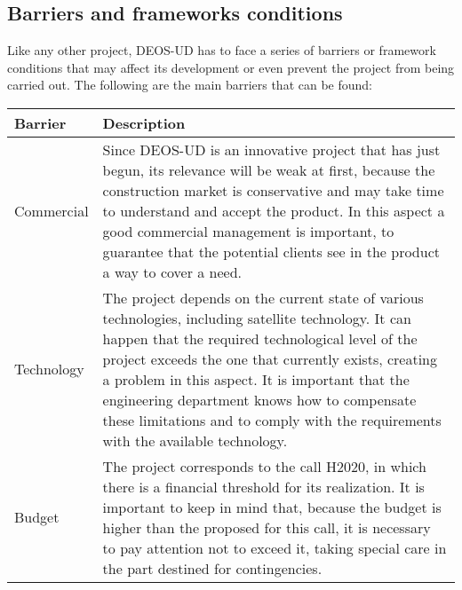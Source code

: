 \pagebreak

\subsection{Barriers and frameworks conditions}

Like any other project, DEOS-UD has to face a series of barriers or framework conditions that may affect its development or even prevent the project from being carried out. The following are the main barriers that can be found:

\begin{table}[H]
	\centering
	\begin{tabular}{l p{12cm}}
		
		\toprule[2pt]
		
		\textbf{Barrier} &  \textbf{Description}\\
		
		\midrule [1.5pt]
		
		Commercial & Since DEOS-UD is an innovative project that has just begun, its relevance will be weak at first, because the construction market is conservative and may take time to understand and accept the product. In this aspect a good commercial management is important, to guarantee that the potential clients see in the product a way to cover a need.
		\vspace{0.2cm}\\
		
		\midrule
		
		Technology & The project depends on the current state of various technologies, including satellite technology. It can happen that the required technological level of the project exceeds the one that currently exists, creating a problem in this aspect. It is important that the engineering department knows how to compensate these limitations and to comply with the requirements with the available technology.\vspace{0.2cm}\\
		
		\midrule
		
		Budget & The project corresponds to the call H2020, in which there is a financial threshold for its realization. It is important to keep in mind that, because the budget is higher than the proposed for this call, it is necessary to pay attention not to exceed it, taking special care in the part destined for contingencies.\vspace{0.2cm}\\
		

\end{tabular}
\end{table}
